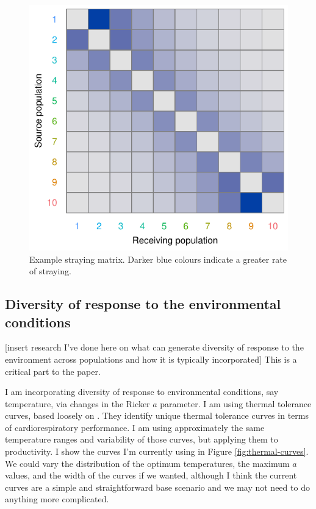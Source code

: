 \documentclass[12pt]{article}
\begin{document}
\begin{figure}[htbp]
\centering
\includegraphics{figure/stray-matrix.pdf}
\caption{Example straying matrix. Darker blue colours indicate a greater
rate of straying.\label{fig:stray-matrix}}
\end{figure}

\subsection{Diversity of response to the environmental conditions}

{[}insert research I've done here on what can generate diversity of
response to the environment across populations and how it is typically
incorporated{]} This is a critical part to the paper.

I am incorporating diversity of response to environmental conditions,
say temperature, via changes in the Ricker $a$ parameter. I am using
thermal tolerance curves, based loosely on \citet{Eliason2011}. They
identify unique thermal tolerance curves in terms of cardiorespiratory
performance. I am using approximately the same temperature ranges and
variability of those curves, but applying them to productivity. I show
the curves I'm currently using in Figure \ref{fig:thermal-curves}. We
could vary the distribution of the optimum temperatures, the maximum $a$
values, and the width of the curves if we wanted, although I think the
current curves are a simple and straightforward base scenario and we may
not need to do anything more complicated.
\end{document}
